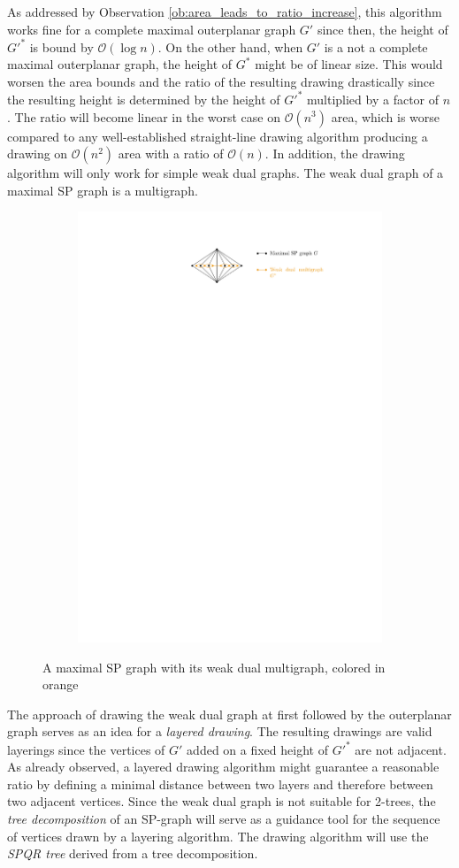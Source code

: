 As addressed by Observation \ref{ob:area_leads_to_ratio_increase}, this algorithm works fine for a complete maximal outerplanar graph $G'$ since then, the height of $G'^*$ is bound by $\mathcal{O}(\log n)$. On the other hand, when $G'$ is a not a complete maximal outerplanar graph, the height of $G^*$ might be of linear size. This would worsen the area bounds and the ratio of the resulting drawing drastically since the resulting height is determined by the height of $G'^*$ multiplied by a factor of $n$. The ratio will become linear in the worst case on $\mathcal{O}(n^3)$ area, which is worse compared to any well-established straight-line drawing algorithm producing a drawing on $\mathcal{O}(n^2)$ area with a ratio of $\mathcal{O}(n)$. In addition, the drawing algorithm will only work for simple weak dual graphs. The weak dual graph of a maximal SP graph is a multigraph.
	\begin{figure}[H]
	\centering
	\begin{subfigure}{\textwidth}
		\centering
		\includegraphics[page=1,width=0.6\linewidth]{graphics/maximal_sp_weak_dual.pdf}
	\end{subfigure}
	\caption{A maximal SP graph with its weak dual multigraph, colored in orange}
\end{figure}
The approach of drawing the weak dual graph at first followed by the outerplanar graph serves as an idea for a \emph{layered drawing}. The resulting drawings are valid layerings since the vertices of $G'$ added on a fixed height of $G'^*$ are not adjacent. As already observed, a layered drawing algorithm might guarantee a reasonable ratio by defining a minimal distance between two layers and therefore between two adjacent vertices. Since the weak dual graph is not suitable for 2-trees, the \emph{tree decomposition} of an SP-graph will serve as a guidance tool for the sequence of vertices drawn by a layering algorithm. The drawing algorithm will use the \emph{SPQR tree} derived from a tree decomposition.\\
